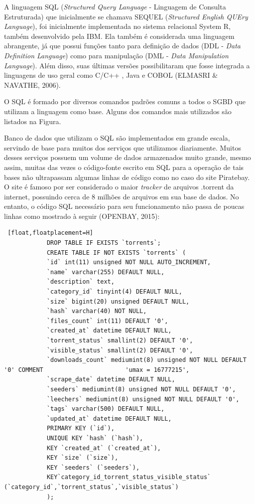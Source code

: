 		A linguagem SQL (\textit{Structured Query Language} - Linguagem de Consulta Estruturada) que inicialmente se chamava SEQUEL (\textit{Structured English QUEry Language}), foi inicialmente implementada no sistema relacional System R, também desenvolvido pela IBM. Ela também é considerada uma linguagem abrangente, já que possui funções tanto para definição de dados (DDL - \textit{Data Definition Language}) como para manipulação (DML - \textit{Data Manipulation Language}). Além disso, suas últimas versões possibilitaram que fosse integrada a linguagens de uso geral como C/C++ , Java e COBOL (ELMASRI \& NAVATHE, 2006).
		
		O SQL é formado por diversos comandos padrões comuns a todos o SGBD que utilizam a linguagem como base. Alguns dos comandos mais utilizados são listados na Figura.
		
		Banco de dados que utilizam o SQL são implementados em grande escala, servindo de base para muitos dos serviços que utilizamos diariamente. Muitos desses serviços possuem um volume de dados armazenados muito grande, mesmo assim, muitas das vezes o código-fonte escrito em SQL para a operação de tais bases não ultrapassam algumas linhas de código como no caso do site Piratebay. O site é famoso por ser considerado o maior \textit{tracker} de arquivos .torrent da internet, possuindo cerca de 8 milhões de arquivos em sua base de dados. No entanto, o código SQL necessário para seu funcionamento não passa de poucas linhas como mostrado à seguir (OPENBAY, 2015):
		
		\newpage
		
		\begin{lstlisting} [float,floatplacement=H]
			DROP TABLE IF EXISTS `torrents`;
			CREATE TABLE IF NOT EXISTS `torrents` (
			`id` int(11) unsigned NOT NULL AUTO_INCREMENT,
			`name` varchar(255) DEFAULT NULL,
			`description` text,
			`category_id` tinyint(4) DEFAULT NULL,
			`size` bigint(20) unsigned DEFAULT NULL,
			`hash` varchar(40) NOT NULL,
			`files_count` int(11) DEFAULT '0',
			`created_at` datetime DEFAULT NULL,
			`torrent_status` smallint(2) DEFAULT '0',
			`visible_status` smallint(2) DEFAULT '0',
			`downloads_count` mediumint(8) unsigned NOT NULL DEFAULT '0' COMMENT                 	   'umax = 16777215',
			`scrape_date` datetime DEFAULT NULL,
			`seeders` mediumint(8) unsigned NOT NULL DEFAULT '0',
			`leechers` mediumint(8) unsigned NOT NULL DEFAULT '0',
			`tags` varchar(500) DEFAULT NULL,
			`updated_at` datetime DEFAULT NULL,
			PRIMARY KEY (`id`),
			UNIQUE KEY `hash` (`hash`),
			KEY `created_at` (`created_at`),
			KEY `size` (`size`),
			KEY `seeders` (`seeders`),
			KEY`category_id_torrent_status_visible_status`     	 (`category_id`,`torrent_status`,`visible_status`)
			);
		\end{lstlisting}
		
